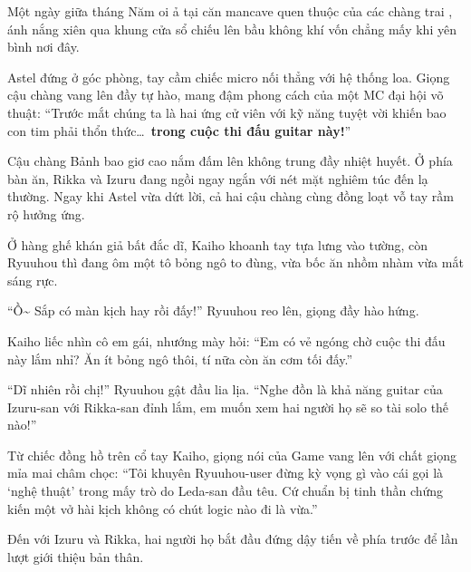 \documentclass[../main.tex]{subfiles}
\begin{document}

Một ngày giữa tháng Năm oi ả tại căn mancave quen thuộc của các chàng trai \hls, ánh nắng xiên qua khung cửa sổ chiếu lên bầu không khí vốn chẳng mấy khi yên bình nơi đây.

Astel đứng ở góc phòng, tay cầm chiếc micro nối thẳng với hệ thống loa. Giọng cậu chàng vang lên đầy tự hào, mang đậm phong cách của một MC đại hội võ thuật: ``Trước mắt chúng ta là hai ứng cử viên với kỹ năng tuyệt vời khiến bao con tim phải thổn thức\dots\ \textbf{trong cuộc thi đấu guitar này!}''

Cậu chàng Bảnh bao giơ cao nắm đấm lên không trung đầy nhiệt huyết. Ở phía bàn ăn, Rikka và Izuru đang ngồi ngay ngắn với nét mặt nghiêm túc đến lạ thường. Ngay khi Astel vừa dứt lời, cả hai cậu chàng cùng đồng loạt vỗ tay rầm rộ hưởng ứng.


Ở hàng ghế khán giả bất đắc dĩ, Kaiho khoanh tay tựa lưng vào tường, còn Ryuuhou thì đang ôm một tô bỏng ngô to đùng, vừa bốc ăn nhồm nhàm vừa mắt sáng rực.

``Ồ\~{} Sắp có màn kịch hay rồi đấy!'' Ryuuhou reo lên, giọng đầy hào hứng.

Kaiho liếc nhìn cô em gái, nhướng mày hỏi: ``Em có vẻ ngóng chờ cuộc thi đấu này lắm nhỉ? Ăn ít bỏng ngô thôi, tí nữa còn ăn cơm tối đấy.''

``Dĩ nhiên rồi chị!'' Ryuuhou gật đầu lia lịa. ``Nghe đồn là khả năng guitar của Izuru-san với Rikka-san đỉnh lắm, em muốn xem hai người họ sẽ so tài solo thế nào!''

Từ chiếc đồng hồ trên cổ tay Kaiho, giọng nói của Game vang lên với chất giọng mỉa mai châm chọc: ``Tôi khuyên Ryuuhou-user đừng kỳ vọng gì vào cái gọi là `nghệ thuật' trong mấy trò do Leda-san đầu têu. Cứ chuẩn bị tinh thần chứng kiến một vở hài kịch không có chút logic nào đi là vừa.''

Đến với Izuru và Rikka, hai người họ bắt đầu đứng dậy tiến về phía trước để lần lượt giới thiệu bản thân.
\end{document}
